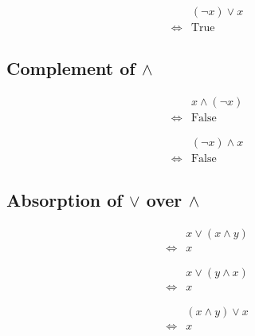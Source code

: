 \begin{prop}
\label{Proposition:lor_complement_2}
\begin{align*}
& (\lnot x) \lor x \\
\iff & \text{True}
\end{align*}
\end{prop}

\subsection{Complement of $\land$}
\begin{prop}
\label{Proposition:land_complement_1}
\begin{align*}
& x \land (\lnot x) \\
\iff & \text{False}
\end{align*}
\end{prop}

\begin{prop}
\label{Proposition:land_complement_2}
\begin{align*}
& (\lnot x) \land x \\
\iff & \text{False}
\end{align*}
\end{prop}

\subsection{Absorption of $\lor$ over $\land$}
\begin{prop}
\label{Proposition:lor_land_absorption_1}
\begin{align*}
& x \lor (x \land y) \\
\iff & x
\end{align*}
\end{prop}

\begin{prop}
\label{Proposition:lor_land_absorption_2}
\begin{align*}
& x \lor (y \land x) \\
\iff & x
\end{align*}
\end{prop}

\begin{prop}
\label{Proposition:lor_land_absorption_3}
\begin{align*}
& (x \land y) \lor x \\
\iff & x
\end{align*}
\end{prop}

